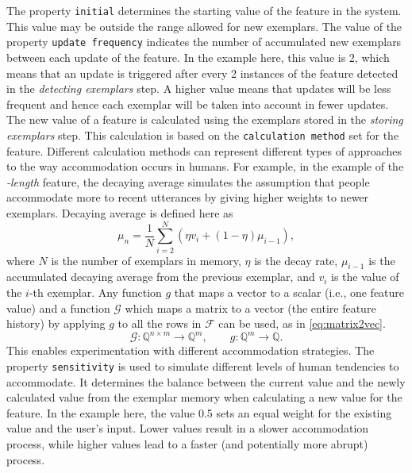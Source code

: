 The property \texttt{initial} determines the starting value of the feature in the system.
This value may be outside the range allowed for new exemplars.
The value of the property \texttt{update frequency} indicates the number of accumulated new exemplars between each update of the feature.
In the example here, this value is 2, which means that an update is triggered after every 2 instances of the feature detected in the \emph{detecting exemplars} step.
A higher value means that updates will be less frequent and hence each exemplar will be taken into account in fewer updates.
The new value of a feature is calculated using the exemplars stored in the \emph{storing exemplars} step.
This calculation is based on the \texttt{calculation method} set for the feature.
Different calculation methods can represent different types of approaches to the way accommodation occurs in humans.
For example, in the example of the \emph{-length} feature, the decaying average simulates the assumption that people accommodate more to recent utterances by giving higher weights to newer exemplars.
Decaying average is defined here as
%
\begin{equation} 
	\label{eq:decaying_average} 
	\mu_n = \frac{1}{N}\sum_{i=2}^{N}(\eta v_i + (1 - \eta )\mu_{i-1}), 
\end{equation} 
\noindent
%
where $N$ is the number of exemplars in memory, $\eta$ is the decay rate, $\mu_{i-1}$ is the accumulated decaying average from the previous exemplar, and $v_i$ is the value of the $i$-th exemplar. 
Any function $g$ that maps a vector to a scalar (i.e., one feature value) and a function $\mathcal{G}$ which maps a matrix to a vector (the entire feature history) by applying $g$ to all the rows in $\mathcal{F}$ can be used, as in \cref{eq:matrix2vec}.
%
\begin{equation}
	\label{eq:matrix2vec}
	\mathcal{G}: \mathbb{Q}^{n \times m} \longrightarrow \mathbb{Q}^{m}, \qquad g: \mathbb{Q}^{m} \longrightarrow \mathbb{Q}.
\end{equation}
\noindent
%
This enables experimentation with different accommodation strategies.
The property \texttt{sensitivity} is used to simulate different levels of human tendencies to accommodate.
It determines the balance between the current value and the newly calculated value from the exemplar memory when calculating a new value for the feature.
In the example here, the value 0.5 sets an equal weight for the existing value and the user's input.
Lower values result in a slower accommodation process, while higher values lead to a faster (and potentially more abrupt) process.
